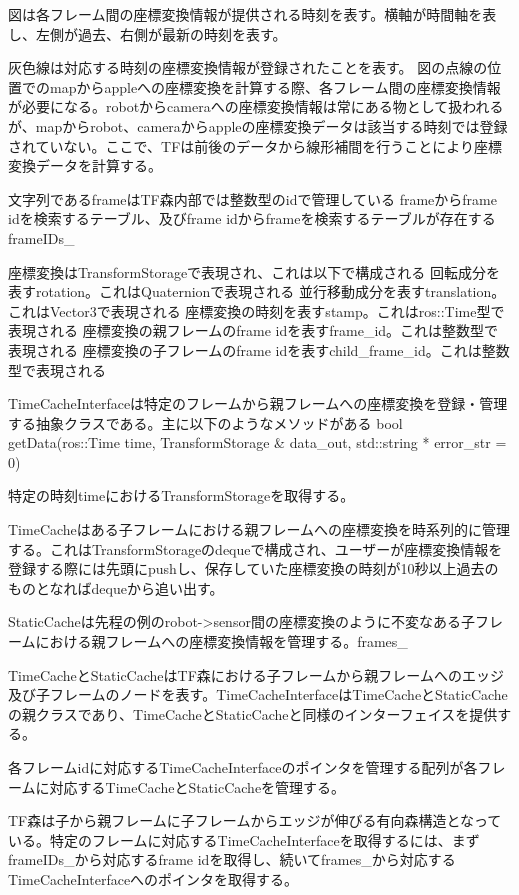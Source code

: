\documentclass{article}
\begin{document}
\begin{multicols}{2}

図は各フレーム間の座標変換情報が提供される時刻を表す。横軸が時間軸を表し、左側が過去、右側が最新の時刻を表す。

灰色線は対応する時刻の座標変換情報が登録されたことを表す。
図の点線の位置でのmapからappleへの座標変換を計算する際、各フレーム間の座標変換情報が必要になる。robotからcameraへの座標変換情報は常にある物として扱われるが、mapからrobot、cameraからappleの座標変換データは該当する時刻では登録されていない。ここで、TFは前後のデータから線形補間を行うことにより座標変換データを計算する。




文字列であるframeはTF森内部では整数型のidで管理している
frameからframe idを検索するテーブル、及びframe idからframeを検索するテーブルが存在する frameIDs_

座標変換はTransformStorageで表現され、これは以下で構成される
回転成分を表すrotation。これはQuaternionで表現される
並行移動成分を表すtranslation。これはVector3で表現される
座標変換の時刻を表すstamp。これはros::Time型で表現される
座標変換の親フレームのframe idを表すframe\_id。これは整数型で表現される
座標変換の子フレームのframe idを表すchild\_frame\_id。これは整数型で表現される

TimeCacheInterfaceは特定のフレームから親フレームへの座標変換を登録・管理する抽象クラスである。主に以下のようなメソッドがある
bool getData(ros::Time time, TransformStorage & data_out, std::string * error_str = 0)

特定の時刻timeにおけるTransformStorageを取得する。

TimeCacheはある子フレームにおける親フレームへの座標変換を時系列的に管理する。これはTransformStorageのdequeで構成され、ユーザーが座標変換情報を登録する際には先頭にpushし、保存していた座標変換の時刻が10秒以上過去のものとなればdequeから追い出す。

StaticCacheは先程の例のrobot->sensor間の座標変換のように不変なある子フレームにおける親フレームへの座標変換情報を管理する。frames_

TimeCacheとStaticCacheはTF森における子フレームから親フレームへのエッジ及び子フレームのノードを表す。TimeCacheInterfaceはTimeCacheとStaticCacheの親クラスであり、TimeCacheとStaticCacheと同様のインターフェイスを提供する。

各フレームidに対応するTimeCacheInterfaceのポインタを管理する配列が各フレームに対応するTimeCacheとStaticCacheを管理する。

TF森は子から親フレームに子フレームからエッジが伸びる有向森構造となっている。特定のフレームに対応するTimeCacheInterfaceを取得するには、まずframeIDs_から対応するframe idを取得し、続いてframes_から対応するTimeCacheInterfaceへのポインタを取得する。



\end{multicols}
\end{document}
